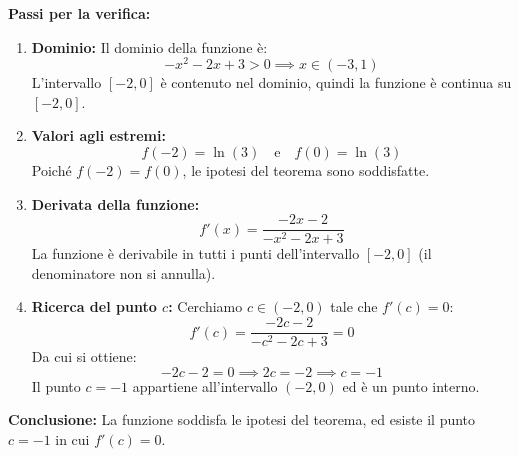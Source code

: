\documentclass[12pt]{article}
\begin{document}
\textbf{Passi per la verifica:}
\begin{enumerate}
    \item \textbf{Dominio:}  
    Il dominio della funzione è:  
    \[
    -x^2 - 2x + 3 > 0 \implies x \in (-3, 1)
    \]
    L'intervallo \([-2, 0]\) è contenuto nel dominio, quindi la funzione è continua su \([-2, 0]\).

    \item \textbf{Valori agli estremi:}  
    \[
    f(-2) = \ln(3) \quad \text{e} \quad f(0) = \ln(3)
    \]
    Poiché \( f(-2) = f(0) \), le ipotesi del teorema sono soddisfatte.

    \item \textbf{Derivata della funzione:}  
    \[
    f'(x) = \frac{-2x - 2}{-x^2 - 2x + 3}
    \]
    La funzione è derivabile in tutti i punti dell'intervallo \([-2, 0]\) (il denominatore non si annulla).

    \item \textbf{Ricerca del punto \( c \):}  
    Cerchiamo \( c \in (-2, 0) \) tale che \( f'(c) = 0 \):
    \[
    f'(c) = \frac{-2c - 2}{-c^2 - 2c + 3} = 0
    \]
    Da cui si ottiene:
    \[
    -2c - 2 = 0 \implies 2c = -2 \implies c = -1
    \]
    Il punto \( c = -1 \) appartiene all’intervallo \((-2, 0)\) ed è un punto interno.
\end{enumerate}

\vspace{0.5cm}

\textbf{Conclusione:}  
La funzione soddisfa le ipotesi del teorema, ed esiste il punto \( c = -1 \) in cui \( f'(c) = 0 \).
\end{document}
